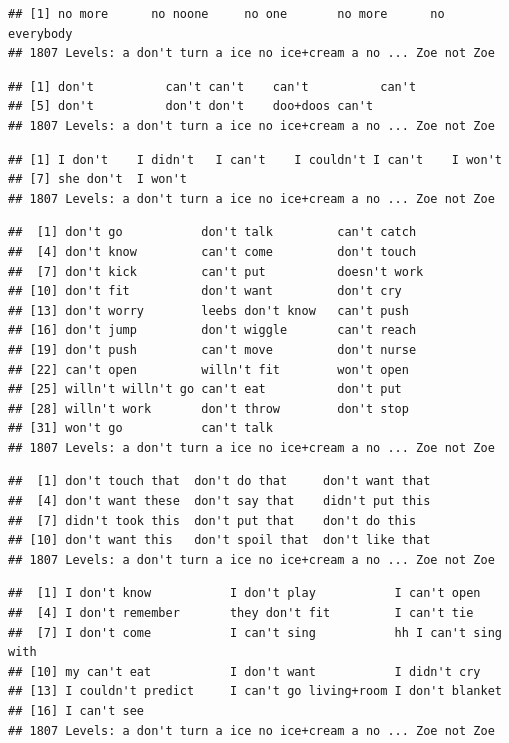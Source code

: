\documentclass[man]{apa6}
\begin{document}
\begin{verbatim}
## [1] no more      no noone     no one       no more      no everybody
## 1807 Levels: a don't turn a ice no ice+cream a no ... Zoe not Zoe
\end{verbatim}

\begin{verbatim}
## [1] don't          can't can't    can't          can't         
## [5] don't          don't don't    doo+doos can't
## 1807 Levels: a don't turn a ice no ice+cream a no ... Zoe not Zoe
\end{verbatim}

\begin{verbatim}
## [1] I don't    I didn't   I can't    I couldn't I can't    I won't   
## [7] she don't  I won't   
## 1807 Levels: a don't turn a ice no ice+cream a no ... Zoe not Zoe
\end{verbatim}

\begin{verbatim}
##  [1] don't go           don't talk         can't catch       
##  [4] don't know         can't come         don't touch       
##  [7] don't kick         can't put          doesn't work      
## [10] don't fit          don't want         don't cry         
## [13] don't worry        leebs don't know   can't push        
## [16] don't jump         don't wiggle       can't reach       
## [19] don't push         can't move         don't nurse       
## [22] can't open         willn't fit        won't open        
## [25] willn't willn't go can't eat          don't put         
## [28] willn't work       don't throw        don't stop        
## [31] won't go           can't talk        
## 1807 Levels: a don't turn a ice no ice+cream a no ... Zoe not Zoe
\end{verbatim}

\begin{verbatim}
##  [1] don't touch that  don't do that     don't want that  
##  [4] don't want these  don't say that    didn't put this  
##  [7] didn't took this  don't put that    don't do this    
## [10] don't want this   don't spoil that  don't like that  
## 1807 Levels: a don't turn a ice no ice+cream a no ... Zoe not Zoe
\end{verbatim}

\begin{verbatim}
##  [1] I don't know           I don't play           I can't open          
##  [4] I don't remember       they don't fit         I can't tie           
##  [7] I don't come           I can't sing           hh I can't sing with  
## [10] my can't eat           I don't want           I didn't cry          
## [13] I couldn't predict     I can't go living+room I don't blanket       
## [16] I can't see           
## 1807 Levels: a don't turn a ice no ice+cream a no ... Zoe not Zoe
\end{verbatim}
\end{document}
